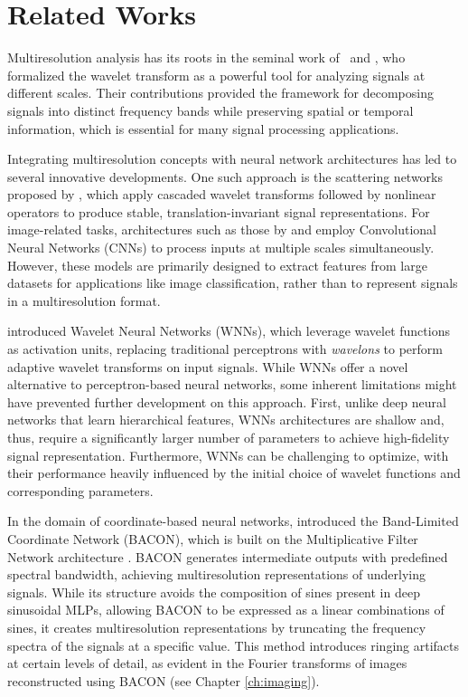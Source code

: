 \section{Related Works}

\sloppy Multiresolution analysis has its roots in the seminal work of~\citep{mallat1989theory} and \citep{daubechies92}, who formalized the wavelet transform as a powerful tool for analyzing signals at different scales. Their contributions provided the framework for decomposing signals into distinct frequency bands while preserving spatial or temporal information, which is essential for many signal processing applications.

Integrating multiresolution concepts with neural network architectures has led to several innovative developments. One such approach is the scattering networks proposed by \citet{bruna2013}, which apply cascaded wavelet transforms followed by nonlinear operators to produce stable, translation-invariant signal representations. For image-related tasks, architectures such as those by \citet{sppHe2015} and \citet{YuKoltun2016} employ Convolutional Neural Networks (CNNs) to process inputs at multiple scales simultaneously. However, these models are primarily designed to extract features from large datasets for applications like image classification, rather than to represent signals in a multiresolution format.

\citet{zhangWavelet92} introduced Wavelet Neural Networks (WNNs), which leverage wavelet functions as activation units, replacing traditional perceptrons with \textit{wavelons} to perform adaptive wavelet transforms on input signals. While WNNs offer a novel alternative to perceptron-based neural networks, some inherent limitations might have prevented further development on this approach. First, unlike deep neural networks that learn hierarchical features, WNNs architectures are shallow and, thus, require a significantly larger number of parameters to achieve high-fidelity signal representation. Furthermore, WNNs can be challenging to optimize, with their performance heavily influenced by the initial choice of wavelet functions and corresponding parameters.

In the domain of coordinate-based neural networks, \citet{bacon2021} introduced the Band-Limited Coordinate Network (BACON), which is built on the Multiplicative Filter Network architecture \citep{fathony2020multiplicative}. BACON generates intermediate outputs with predefined spectral bandwidth, achieving multiresolution representations of underlying signals. While its structure avoids the composition of sines present in deep sinusoidal MLPs, allowing BACON to be expressed as a linear combinations of sines, it creates multiresolution representations by truncating the frequency spectra of the signals at a specific value. This method introduces ringing artifacts at certain levels of detail, as evident in the Fourier transforms of images reconstructed using BACON (see Chapter \ref{ch:imaging}).

